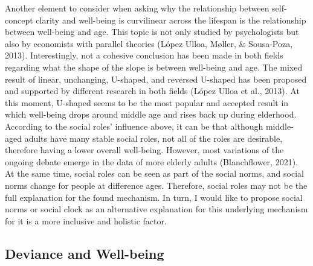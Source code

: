 \documentclass[
  man,floatsintext]{apa6}
\begin{document}
Another element to consider when asking why the relationship between self-concept clarity and well-being is curvilinear across the lifespan is the relationship between well-being and age. This topic is not only studied by psychologists but also by economists with parallel theories (López Ulloa, Møller, \& Sousa-Poza, 2013). Interestingly, not a cohesive conclusion has been made in both fields regarding what the shape of the slope is between well-being and age. The mixed result of linear, unchanging, U-shaped, and reversed U-shaped has been proposed and supported by different research in both fields (López Ulloa et al., 2013). At this moment, U-shaped seems to be the most popular and accepted result in which well-being drops around middle age and rises back up during elderhood. According to the social roles' influence above, it can be that although middle-aged adults have many stable social roles, not all of the roles are desirable, therefore having a lower overall well-being. However, most variations of the ongoing debate emerge in the data of more elderly adults (Blanchflower, 2021).
At the same time, social roles can be seen as part of the social norms, and social norms change for people at difference ages. Therefore, social roles may not be the full explanation for the found mechanism. In turn, I would like to propose social norms or social clock as an alternative explanation for this underlying mechanism for it is a more inclusive and holistic factor.

\hypertarget{deviance-and-well-being}{%
\subsection{Deviance and Well-being}\label{deviance-and-well-being}}
\end{document}
